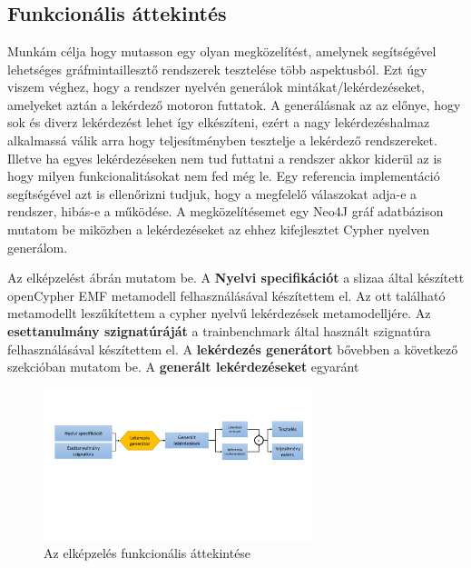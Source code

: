 \chapter{\attekintes}

\section{Funkcionális áttekintés}

Munkám célja hogy mutasson egy olyan megközelítést, amelynek segítségével lehetséges gráfmintaillesztő
rendszerek tesztelése több aspektusból. Ezt úgy viszem véghez, hogy a rendszer nyelvén generálok
mintákat/lekérdezéseket, amelyeket aztán a lekérdező motoron futtatok. A generálásnak az az előnye,
hogy sok és diverz lekérdezést lehet így elkészíteni, ezért a nagy lekérdezéshalmaz alkalmassá válik
arra hogy teljesítményben tesztelje a lekérdező rendszereket. Illetve ha egyes lekérdezéseken nem tud
futtatni a rendszer akkor kiderül az is hogy milyen funkcionalitásokat nem fed még le. Egy 
referencia implementáció segítségével azt is ellenőrizni tudjuk, hogy a megfelelő válaszokat adja-e
a rendszer, hibás-e a működése. A megközelítésemet egy Neo4J \cite{neo4j} gráf adatbázison mutatom be 
miközben a lekérdezéseket az ehhez kifejlesztet Cypher \cite{Cypher} nyelven generálom.

Az elképzelést  ábrán mutatom be. A \textbf{Nyelvi specifikációt} a slizaa \cite{slizaa_2018} által készített openCypher EMF \cite{EMF} metamodell felhasználásával készítettem el. Az ott található metamodellt leszűkítettem a
cypher nyelvű  lekérdezések metamodelljére. Az \textbf{esettanulmány szignatúráját} a trainbenchmark \cite{szarnyas2018train} által használt szignatúra felhasználásával készítettem el. A \textbf{lekérdezés generátort} bővebben a következő szekcióban mutatom be. A \textbf{generált lekérdezéseket} egyaránt 

\begin{figure}
	\centering
	\includegraphics[width=0.7\textwidth]{figures/funkcionalisAttekintes}
	\caption{Az elképzelés funkcionális áttekintése}
	\label{fig:funkcionalisAttekintes}
\end{figure}
 
